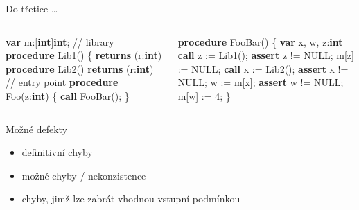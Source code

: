 \documentclass[11pt]{beamer}
\begin{document}
\begin{frame}[fragile]{Do třetice \ldots}
\begin{columns}

\begin{column}{0.5\textwidth}
\begin{semiverbatim}
\textbf{var} m:[\textbf{int}]\textbf{int};
\pause
// library
\textbf{procedure} Lib1() \{
  \textbf{returns} (r:\textbf{int})
\textbf{procedure} Lib2()
  \textbf{returns} (r:\textbf{int})
\pause
// entry point
\textbf{procedure} Foo(z:\textbf{int}) \{
  \textbf{call} FooBar();
\}
\end{semiverbatim}
\end{column}

\begin{column}{0.5\textwidth}
\begin{semiverbatim}
\pause
\textbf{procedure} FooBar() \{
  \textbf{var} x, w, z:\textbf{int}\pause\onslide<+->
  \textbf{call} z := Lib1();\onslide<+->
  \textbf{assert} z != NULL;\pause\onslide<+->
  m[z] := NULL;\onslide<+->
  \textbf{call} x := Lib2();\onslide<+->
  \textbf{assert} x != NULL;\pause\onslide<+->
  w := m[x];\onslide<+->
  \textbf{assert} w != NULL;\pause\onslide<+->
  m[w] := 4;
\}
\end{semiverbatim}
\end{column}

\end{columns}
\end{frame}

\begin{frame}{Možné defekty}
\begin{itemize}
\pause \item definitivní chyby
\pause \item možné chyby / nekonzistence
\pause \item chyby, jimž lze zabrát vhodnou vstupní podmínkou
\end{itemize}

\end{frame}
\end{document}
